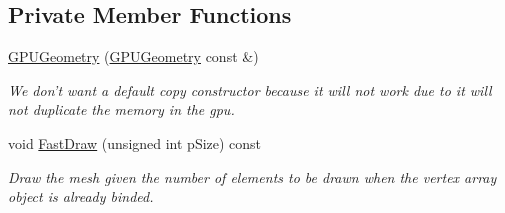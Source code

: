 \subsection*{Private Member Functions}
\begin{DoxyCompactItemize}
\item 
\hyperlink{class_g_p_u_geometry_aee5a2f57e66ceb1e59aece9b98a6a525}{G\+P\+U\+Geometry} (\hyperlink{class_g_p_u_geometry}{G\+P\+U\+Geometry} const \&)
\begin{DoxyCompactList}\small\item\em We don't want a default copy constructor because it will not work due to it will not duplicate the memory in the gpu. \end{DoxyCompactList}\item 
void \hyperlink{class_g_p_u_geometry_a55595c292b333445165a5c7c016f49f0}{Fast\+Draw} (unsigned int p\+Size) const 
\begin{DoxyCompactList}\small\item\em Draw the mesh given the number of elements to be drawn when the vertex array object is already binded. \end{DoxyCompactList}\end{DoxyCompactItemize}
